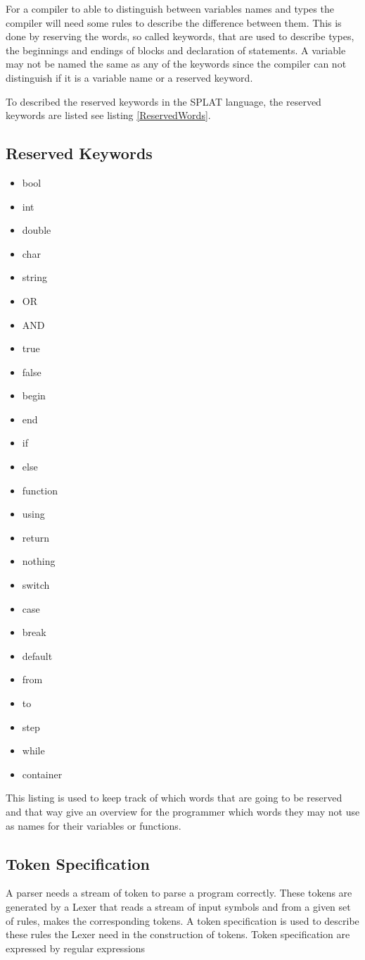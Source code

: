 For a compiler to able to distinguish between variables names and types the compiler will need some rules to describe the difference between them. This is done by reserving the words, so called keywords, that are used to describe types, the beginnings and endings of blocks and declaration of statements. A variable may not be named the same as any of the keywords since the compiler can not distinguish if it is a variable name or a reserved keyword.

To described the reserved keywords in the SPLAT language, the reserved keywords are listed see listing \ref{ReservedWords}.
\subsection{Reserved Keywords}
\begin{itemize}
\label{lst:ReservedWords}
\item bool
\item int
\item double
\item char
\item string
\item OR
\item AND
\item true
\item false
\item begin
\item end
\item if
\item else
\item function
\item using
\item return
\item nothing
\item switch
\item case
\item break
\item default
\item from
\item to
\item step
\item while
\item container

\end{itemize}
This listing is used to keep track of which words that are going to be reserved and that way give an overview for the programmer which words they may not use as names for their variables or functions. 

\subsection{Token Specification}
A parser needs a stream of token to parse a program correctly. These tokens are generated by a Lexer that reads a stream of input symbols and from a given set of rules, makes the corresponding tokens. A token specification is used to describe these rules the Lexer need in the construction of tokens. Token specification are expressed by regular expressions

